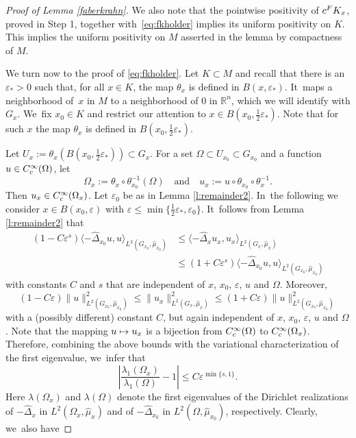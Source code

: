 \documentclass[11pt]{article}
\newcommand\mto{\mathchoice{\longmapsto}{\mapsto}{\mapsto}{\mapsto}}
\newcommand{\rc}{\textup{c}}
\newcommand{\FK}{\textup{FK}}
\theoremstyle{definition}
\let\epsilon\varepsilon
\newcommand{\1}{\mathbbm{1}}
\newcommand{\R}{\mathbb{R}}
\numberwithin{equation}{section}
\begin{document}
\begin{proof}[Proof of Lemma \ref{faberkrahn}]
We also note that the pointwise positivity of $c^\FK_x$, proved in Step 1, together with~\eqref{eq:fkholder} implies its uniform positivity on $K$. This implies the uniform positivity on $M$ asserted in the lemma by compactness of $M$.

We turn now to the proof of \eqref{eq:fkholder}. Let $K\subset M$ and recall that there is an $\epsilon_*>0$ such that, for all $x\in K$, the map $\theta_x$ is defined in $B(x,\epsilon_*)$. It~maps a neighborhood of~$x$ in $M$ to a neighborhood of $0$ in $\R^n$, which we will identify with $G_x$. We~fix $x_0\in K$ and restrict our attention to $x\in B(x_0,\frac12\epsilon_*)$. Note that for such $x$ the map $\theta_x$ is defined in $B(x_0,\frac12\epsilon_*)$.

Let $U_x :=\theta_{x}(B(x_0,\frac12\epsilon_*))\subset G_x$. For a set $\Omega\subset U_{x_0}\subset G_{x_0}$ and a function $u\in C^\infty_\rc(\Omega)$, let
\[
\Omega_x:= \theta_x\circ \theta_{x_0}^{-1}(\Omega)
\quad\text{and}\quad
u_x := u \circ \theta_{x_0} \circ \theta_x^{-1}.
\]
Then $u_x\in C^\infty_\rc(\Omega_x)$. Let $\epsilon_0$ be as in Lemma \ref{l:remainder2}. In~the following we consider $x\in B(x_0,\epsilon)$ with $\epsilon\leq\min\{\frac12\epsilon_*,\epsilon_0\}$. It~follows from Lemma \ref{l:remainder2} that
\begin{align*}
(1-C \epsilon^s) \langle -\widehat\Delta_{x_0} u, u \rangle_{L^2(G_{x_0},\widehat\mu_{x_0})} & \leq
\langle -\widehat\Delta_{x} u_x, u_x \rangle_{L^2(G_{x},\widehat\mu_{x})} \\
& \leq (1+C \epsilon^s) \langle -\widehat\Delta_{x_0} u, u \rangle_{L^2(G_{x_0},\widehat\mu_{x_0})}
\end{align*}
with constants $C$ and $s$ that are independent of $x$, $x_0$, $\epsilon$, $u$ and $\Omega$. Moreover,
\[
(1-C \epsilon) \| u \|_{L^2(G_{x_0},\widehat\mu_{x_0})}^2 \leq
\| u_x \|_{L^2(G_{x},\widehat\mu_{x})}^2
\leq (1+C \epsilon) \| u \|_{L^2(G_{x_0},\widehat\mu_{x_0})}^2
\]
with a (possibly different) constant $C$, but again independent of $x$, $x_0$, $\epsilon$, $u$ and $\Omega$. Note that the mapping $u\mto u_x$ is a bijection from $C^\infty_\rc(\Omega)$ to $C^\infty_\rc(\Omega_x)$. Therefore, combining the above bounds with the variational characterization of the first eigenvalue, we~infer that
\begin{equation}
\label{eq:fkcontproof1}
\left| \frac{\lambda_1(\Omega_x)}{\lambda_1(\Omega)} - 1\right| \leq C \epsilon^{\min\{s,1\}}.
\end{equation}
Here $\lambda(\Omega_x)$ and $\lambda(\Omega)$ denote the first eigenvalues of the Dirichlet realizations of $-\widehat\Delta_x$ in $L^2(\Omega_x,\widehat\mu_x)$ and of $-\widehat\Delta_{x_0}$ in $L^2(\Omega,\widehat\mu_{x_0})$, respectively. Clearly, we~also have

\end{proof}
\end{document}
